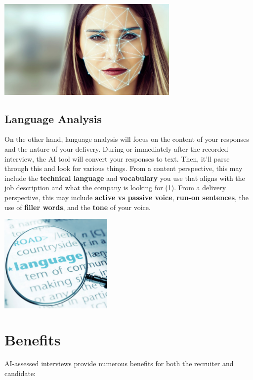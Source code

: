 \documentclass[
]{book}
\begin{document}
\includegraphics[width=3.46875in,height=\textheight]{Facial_Analysis.png}

\hypertarget{language-analysis}{%
\subsection{Language Analysis}\label{language-analysis}}

On the other hand, language analysis will focus on the content of your responses and the nature of your delivery. During or immediately after the recorded interview, the AI tool will convert your responses to text. Then, it'll parse through this and look for various things. From a content perspective, this may include the \textbf{technical language} and \textbf{vocabulary} you use that aligns with the job description and what the company is looking for (1). From a delivery perspective, this may include \textbf{active vs passive voice}, \textbf{run-on sentences}, the use of \textbf{filler words}, and the \textbf{tone} of your voice.

\includegraphics[width=2.16667in,height=\textheight]{Language_Analysis.png}

\hypertarget{benefits-1}{%
\section{Benefits}\label{benefits-1}}

AI-assessed interviews provide numerous benefits for both the recruiter and candidate:
\end{document}
